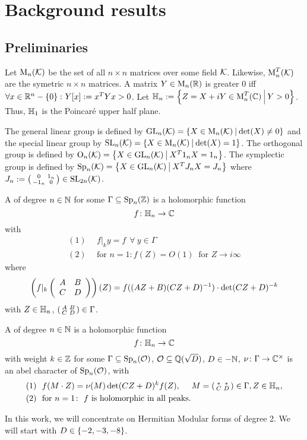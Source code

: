 
\section{Background results}

\subsection{Preliminaries}

Let $\operatorname{M}_n(\mathcal{K})$ be the set of all $n \times n$ matrices over some field $\mathcal{K}$.
Likewise, $\operatorname{M}_n^T(\mathcal{K})$ are the symetric $n \times n$ matrices.
A matrix $Y \in \operatorname{M}_n(\mathbb{R})$ is greater $0$ iff $\forall x \in \R^n - \Set{0} \colon Y[x] := x^T Y x > 0$.
Let $\HalfPlane_n := \Set{Z = X + iY \in \M_n^T(\C)}{Y > 0}$.
Thus, $\mathbb{H}_1$ is the Poincaré upper half plane.

The general linear group is defined by $\GL_n(\K) = \Set{X \in \M_n(\K)}{\det(X) \neq 0}$
and the special linear group by $\SL_n(\K) = \Set{X \in \M_n(\K)}{\det(X) = 1}$. %
The orthogonal group is defined by $\Orth_n(\K) = \Set{X \in \GL_n(\K)}{X^T 1_n X = 1_n}$. %
The symplectic group is defined by $\Sp_n(\K) = \Set{X \in \GL_n(\K)}{X^T J_n X = J_n}$ %
where $J_n := \left( \begin{smallmatrix} 0 & 1_n \\ -1_n & 0 \end{smallmatrix} \right) \in \operatorname{SL}_{2n}(\mathcal{K})$. %

A  of degree $n\in\mathbb{N}$ for some $\Gamma \subseteq \operatorname{Sp}_n(\mathbb{Z})$ is a holomorphic function
\[ f \colon \mathbb{H}_n \rightarrow \mathbb{C} \]
with
\begin{align*}
(1) \ \ & f |_k y = f \ \ \forall \ y \in \Gamma \\
(2) \ \ & \text{for } n = 1 \colon f(Z) = O(1) \ \text{ for } Z \rightarrow i \infty
\end{align*}
where
\[ \left( f|_k \left( \begin{array}{cc} A & B \\ C & D \end{array} \right) \right) (Z) =
f((AZ + B)(CZ + D)^{-1}) \cdot \det(CZ + D)^{-k} \]
with $Z \in \mathbb{H}_n$, $\left( \begin{smallmatrix} A & B \\ C & D \end{smallmatrix} \right) \in \Gamma$.

A  of degree $n\in\mathbb{N}$
is a holomorphic function
\[ f \colon \mathbb{H}_n \rightarrow \mathbb{C} \]
with weight $k\in \mathbb{Z}$ for some $\Gamma \subseteq \operatorname{Sp}_n(\mathcal{O})$, $\mathcal{O} \subseteq \mathbb{Q}(\sqrt{D})$, $D \in -\mathbb{N}$, $\nu \colon \Gamma \rightarrow \mathbb{C}^\times$ is an abel character of $\operatorname{Sp}_n(\mathcal{O})$, with
\begin{align*}
(1) \ \ & f(M \cdot Z) = \nu(M) \det(CZ + D)^k f(Z), \ \ \ \ M = \left( \begin{smallmatrix} * & * \\ C & D \end{smallmatrix} \right) \in \Gamma, Z \in \mathbb{H}_n , \\
(2) \ \ & \text{for } n = 1 \colon \ \text{$f$ is holomorphic in all peaks} .
\end{align*}


In this work, we will concentrate on Hermitian Modular forms of degree 2. We will start with $D \in \Set{-2,-3,-8}$.
